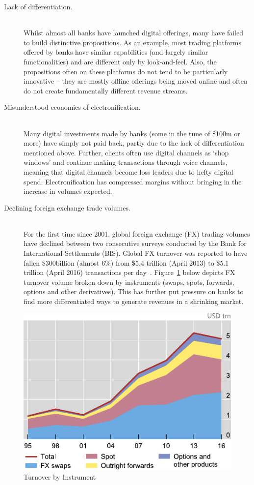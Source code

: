 \begin{description}
    \item[Lack of differentiation.]\strut\\ Whilst almost all banks have launched digital offerings, many have failed to build distinctive propositions. As an example, most trading platforms offered by banks have similar capabilities (and largely similar functionalities) and are different only by look-and-feel. Also, the propositions often on these platforms do not tend to be particularly innovative -- they are mostly offline offerings being moved online and often do not create fundamentally different revenue streams.
    \item[Misunderstood economics of electronification.]\strut\\ Many digital investments made by banks (some in the tune of \$100m or more) have simply not paid back, partly due to the lack of differentiation mentioned above. Further, clients often use digital channels as ‘shop windows’ and continue making transactions through voice channels, meaning that digital channels become loss leaders due to hefty digital spend. Electronification has compressed margins without bringing in the increase in volumes expected.
    \item[Declining foreign exchange trade volumes.]\strut\\ For the first time since 2001, global foreign exchange (FX) trading volumes have declined between two consecutive surveys conducted by the Bank for International Settlements (BIS). Global FX turnover was reported to have fallen \$300billion (almost 6\%) from \$5.4 trillion (April 2013) to \$5.1 trillion (April 2016) transactions per day~\autocite{moore2016downsized}. Figure~\ref{Ch2Fig:2} below depicts FX turnover volume broken down by instruments (swaps, spots, forwards, options and other derivatives). This has further put pressure on banks to find more differentiated ways to generate revenues in a shrinking market.
\end{description}

      
\begin{figure}[!htb]\centering
\includegraphics[width=0.6\linewidth]{./figures/Ch1fig2.pdf}
\caption{Turnover by Instrument~\autocite{moore2016downsized}}\label{Ch2Fig:2}
\end{figure}

